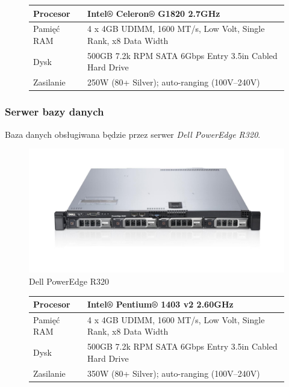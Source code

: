 \begin{figure}[H]
\begin{center}
\begin{tabular}{|l|l|}
  \hline
  Procesor & Intel® Celeron® G1820 2.7GHz \\ \hline
  Pamięć RAM & 4 x 4GB UDIMM, 1600 MT/s, Low Volt, Single Rank, x8 Data Width \\ \hline
  Dysk & 500GB 7.2k RPM SATA 6Gbps Entry 3.5in Cabled Hard Drive \\ \hline
  Zasilanie & 250W (80+ Silver); auto-ranging (100V--240V) \\ \hline

\end{tabular}
\end{center}
\end{figure}

\subsubsection{Serwer bazy danych}

Baza danych obsługiwana będzie przez serwer \textit{Dell PowerEdge R320}.

\begin{figure}[H]
  \includegraphics[width=\textwidth]{images/poweredge-r320.jpg}
  \caption{Dell PowerEdge R320}
\end{figure}

\begin{figure}[H]
\begin{center}
\begin{tabular}{|l|l|}
  \hline
  Procesor & Intel® Pentium® 1403 v2 2.60GHz \\ \hline
  Pamięć RAM & 4 x 4GB UDIMM, 1600 MT/s, Low Volt, Single Rank, x8 Data Width \\ \hline
  Dysk & 500GB 7.2k RPM SATA 6Gbps Entry 3.5in Cabled Hard Drive \\ \hline
  Zasilanie & 350W (80+ Silver); auto-ranging (100V--240V) \\ \hline

\end{tabular}
\end{center}
\end{figure}

